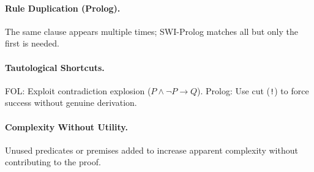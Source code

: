 \documentclass[11pt,twocolumn]{article}
\begin{document}
\paragraph{Rule Duplication (Prolog).}
The same clause appears multiple times; SWI-Prolog matches all but only the first is needed.

\paragraph{Tautological Shortcuts.}
FOL: Exploit contradiction explosion ($P \land \neg P \to Q$).
Prolog: Use cut (\texttt{!}) to force success without genuine derivation.

\paragraph{Complexity Without Utility.}
Unused predicates or premises added to increase apparent complexity without contributing to the proof.
\end{document}
